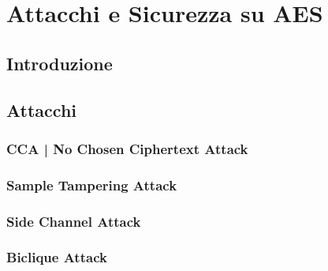 
\chapter{Attacchi e Sicurezza su AES} %




\section{Introduzione}

\textsf{\small }


\section{Attacchi}

\textsf{\small }

\subsection{CCA | No Chosen Ciphertext Attack}

\textsf{\small }

\subsection{Sample Tampering Attack}

\textsf{\small }

\subsection{Side Channel Attack}

\textsf{\small }

\subsection{Biclique Attack}


